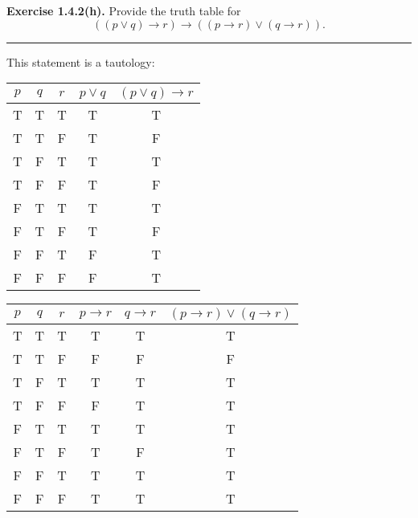 \documentclass{article}
\begin{document}
\newpage{}

\noindent\textbf{Exercise 1.4.2(h).} Provide the truth table for
\[
    \left( \left( p \vee q \right) \to r \right) \to \left( \left( p \to r \right) \vee \left( q \to r \right) \right).
\]

\vspace{0.2cm}
\hrule{}
\vspace{0.2cm}

This statement is a tautology:

\begin{table}[h!]
\begin{tabular}{ccc|cc}
$p$ & $q$ & $r$ & $p \vee q$ & $\left( p \vee q \right) \to r$ \\ \hline
T   & T   & T   & T          & T \\
T   & T   & F   & T          & F \\
T   & F   & T   & T          & T \\
T   & F   & F   & T          & F \\
F   & T   & T   & T          & T \\
F   & T   & F   & T          & F \\
F   & F   & T   & F          & T \\
F   & F   & F   & F          & T \\
\end{tabular}
\end{table}

\begin{table}[h!]
\begin{tabular}{ccc|ccc}
$p$ & $q$ & $r$ & $p \to r$ & $q \to r$ & $\left( p \to r\right ) \vee \left( q \to r \right)$ \\ \hline
T   & T   & T   & T & T & T \\
T   & T   & F   & F & F & F \\
T   & F   & T   & T & T & T \\
T   & F   & F   & F & T & T \\
F   & T   & T   & T & T & T \\
F   & T   & F   & T & F & T \\
F   & F   & T   & T & T & T \\
F   & F   & F   & T & T & T \\
\end{tabular}
\end{table}
\end{document}
